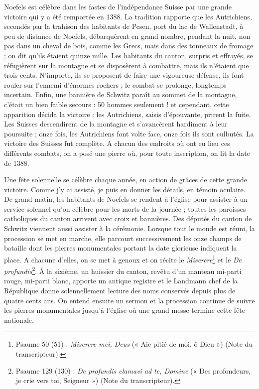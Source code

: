 \documentclass[11pt,a4paper]{report}
\begin{document}
Noefels est célèbre dans les fastes de l'indépendance Suisse par une grande victoire qui y a été remportée en 1388. La tradition rapporte que les Autrichiens, secondés par la trahison des habitants de Pesen, port du lac de Wallenstadt, à peu de distance de Noefels, débarquèrent en grand nombre, pendant la nuit, non pas dans un cheval de bois, comme les Grecs, mais dans des tonneaux de fromage ; on dit qu'ils étaient quinze mille. Les habitants du canton, surpris et effrayés, se réfugièrent sur la montagne et se disposèrent à combattre, mais ils n'étaient que trois cents. N'importe, ils se proposent de faire une vigoureuse défense, ils font rouler sur l'ennemi d'énormes rochers ; le combat se prolonge, longtemps incertain. Enfin, une bannière de Schwitz paraît au sommet de la montagne, c'était un bien faible secours : 50 hommes seulement ! et cependant, cette apparition décida la victoire : les Autrichiens, saisis d'épouvante, prirent la fuite. Les Suisses descendirent de la montagne et s'avancèrent hardiment à leur poursuite ; onze fois, les Autrichiens font volte face, onze fois ils sont culbutés. La victoire des Suisses fut complète. A chacun des endroits où ont eu lieu ces différents combats, on a posé une pierre où, pour toute inscription, on lit la date de 1388.

Une fête solennelle se célèbre chaque année, en action de grâces de cette grande victoire. Comme j'y ai assisté, je puis en donner les détails, en témoin oculaire. De grand matin, les habitants de Noefels se rendent à l'église pour assister à un service solennel qu'on célèbre pour les morts de la journée ; toutes les paroisses catholiques du canton arrivent avec croix et bannières. Des députés du canton de Schwitz viennent aussi assister à la cérémonie. Lorsque tout le monde est réuni, la procession se met en marche, elle parcourt successivement les onze champs de bataille dont les pierres monumentales portant la date glorieuse indiquent la place. A chacune d'elles, on se met à genoux et on récite le \textit{Miserere}\footnote{Psaume 50 (51) : \textit{Miserere mei, Deus} (« Aie pitié de moi, ô Dieu ») (Note du transcripteur).} et le \textit{De profundis}\footnote{Psaume 129 (130) : \textit{De profundis clamavi ad te, Domine} (« Des profondeurs, je crie vers toi, Seigneur ») (Note du transcripteur).}. À la sixième, un huissier du canton, revêtu d'un manteau mi-parti rouge, mi-parti blanc, apporte un antique registre et le Landmann chef de la République donne solennellement lecture des noms conservés depuis plus de quatre cents ans. On entend ensuite un sermon et la procession continue de suivre les pierres monumentales jusqu'à l'église où une grand messe termine cette fête nationale.
\end{document}

